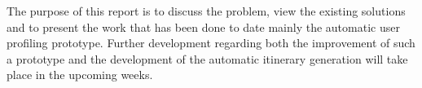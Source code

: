 The purpose of this report is to discuss the problem, view the
existing solutions and to present the work that has been done to date
mainly the automatic user profiling prototype. Further development
regarding both the improvement of such a prototype and the development
of  the automatic itinerary generation will take place in the upcoming
weeks. 